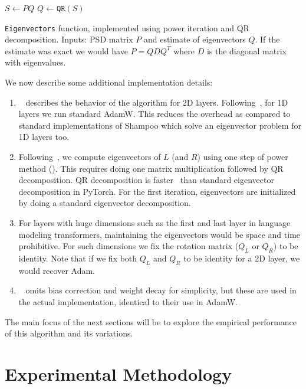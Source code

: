 \documentclass{article} %
\begin{document}
\begin{algorithm}[t]
	
	\begin{algorithmic}[1]
		\STATE $S \gets PQ$
		\STATE $Q \gets \texttt{QR}(S)$
	\end{algorithmic}
	\caption{\texttt{Eigenvectors} function, implemented using power iteration and QR decomposition. Inputs: PSD matrix $P$ and estimate of eigenvectors $Q$. If the estimate was exact we would have $P = Q D Q^T$ where $D$ is the diagonal matrix with eigenvalues.}
	\label{alg:eigenvectors}
\end{algorithm}

We now describe some additional implementation details:
\begin{enumerate}
	\item ~ describes the behavior of the algorithm for 2D layers. Following~\citet{galore}, for 1D layers we run standard AdamW. This reduces the overhead as compared to standard implementations of Shampoo which solve an eigenvector problem for 1D layers too. 
	\item Following~\citet{4bitshampoo}, we compute eigenvectors of $L$ (and $R$) using one step of power method (). This requires doing one matrix multiplication followed by QR decomposition. QR decomposition is faster~\citep{eigh-vs-qr} than standard eigenvector decomposition in PyTorch. For the first iteration, eigenvectors are initialized by doing a standard eigenvector decomposition.  %
	\item For layers with huge dimensions such as the first and last layer in language modeling transformers, maintaining the eigenvectors would be space and time prohibitive. For such dimensions we fix the rotation matrix ($Q_L$ or $Q_R$) to be identity. Note that if we fix both $Q_L$ and $Q_R$ to be identity for a 2D layer, we would recover Adam.
	\item ~ omits bias correction and weight decay for simplicity, but these are used in the actual implementation, identical to their use in AdamW.
\end{enumerate}

The main focus of the next sections will be to explore the empirical performance of this algorithm and its variations.

\section{Experimental Methodology}
\label{sec:methods}
\end{document}
